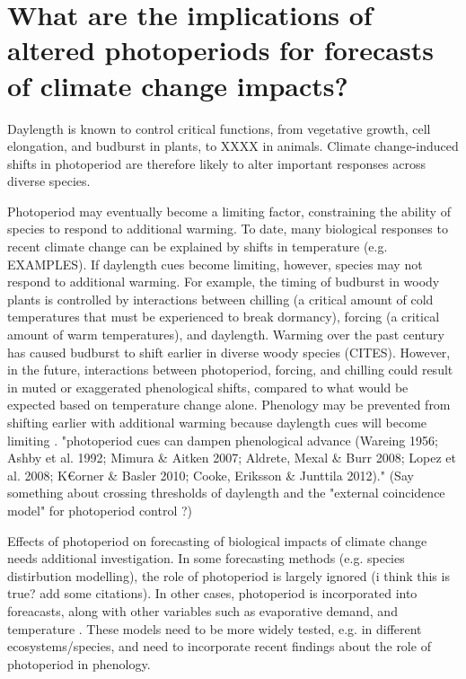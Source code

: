 \documentclass{article}
\begin{document}
\section*{What are the implications of altered photoperiods for forecasts of climate change impacts?}
\par Daylength is known to control critical functions, from vegetative growth, cell elongation, and budburst \citep{Linkosalo:2006aa,erwin1998,sidaway2010, Hsu:2011} in plants, to XXXX in animals. Climate change-induced shifts in photoperiod are therefore likely to alter important responses across diverse species. 
\par Photoperiod may eventually become a limiting factor, constraining the ability of species to respond to additional warming. To date, many biological responses to recent climate change can be explained by shifts in temperature (e.g. EXAMPLES). If daylength cues become limiting, however, species may not respond to additional warming. For example, the timing of budburst in woody plants is controlled by interactions between chilling (a critical amount of cold temperatures that must be experienced to break dormancy), forcing (a critical amount of warm temperatures), and daylength. Warming over the past century has caused budburst to shift earlier in diverse woody species (CITES). However, in the future, interactions between photoperiod, forcing, and chilling could result in muted or exaggerated phenological shifts, compared to what would be expected based on temperature change alone. Phenology may be prevented from shifting earlier with additional warming because daylength cues will become limiting \citep{koerner2010b,vitasse2013, Morin:2010aa}. "photoperiod cues can dampen phenological advance (Wareing 1956; Ashby et al.
1992; Mimura \& Aitken 2007; Aldrete, Mexal \& Burr
2008; Lopez et al. 2008; K€orner \& Basler 2010; Cooke, Eriksson \& Junttila 2012)." (Say something about crossing thresholds of daylength and the "external coincidence model" for photoperiod control \citep{bastow2002,kobayashi2007,andres2012,Singh:2017}?)
\par Effects of photoperiod on forecasting of biological impacts of climate change needs additional investigation. In some forecasting methods (e.g. species distirbution modelling), the role of photoperiod is largely ignored (i think this is true? add some citations). In other cases, photoperiod is incorporated into foreacasts, along with other variables such as evaporative demand, and temperature \citep [e.g. ED] []{jolly2005, medvigy2013}. These models need to be more widely tested, e.g. in different ecosystems/species, and need to incorporate recent findings about the role of photoperiod in phenology.     
\end{document}
